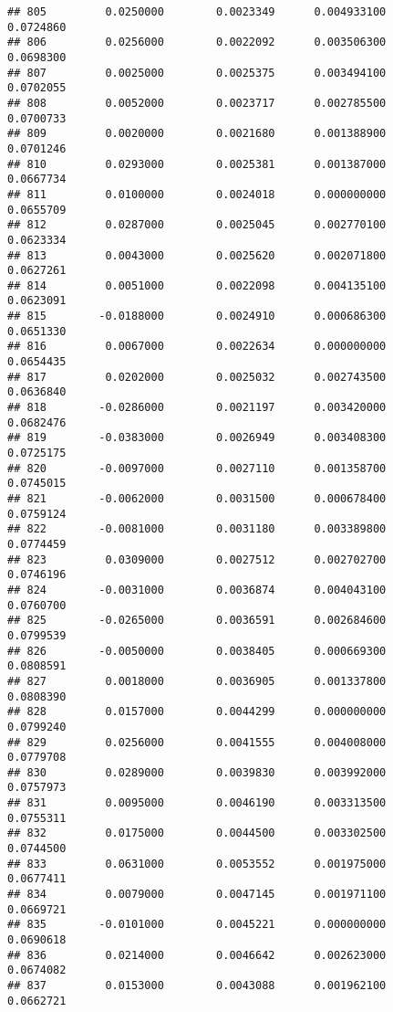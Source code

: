 \documentclass[
]{article}
\begin{document}
\begin{verbatim}
## 805         0.0250000        0.0023349      0.004933100             0.0724860
## 806         0.0256000        0.0022092      0.003506300             0.0698300
## 807         0.0025000        0.0025375      0.003494100             0.0702055
## 808         0.0052000        0.0023717      0.002785500             0.0700733
## 809         0.0020000        0.0021680      0.001388900             0.0701246
## 810         0.0293000        0.0025381      0.001387000             0.0667734
## 811         0.0100000        0.0024018      0.000000000             0.0655709
## 812         0.0287000        0.0025045      0.002770100             0.0623334
## 813         0.0043000        0.0025620      0.002071800             0.0627261
## 814         0.0051000        0.0022098      0.004135100             0.0623091
## 815        -0.0188000        0.0024910      0.000686300             0.0651330
## 816         0.0067000        0.0022634      0.000000000             0.0654435
## 817         0.0202000        0.0025032      0.002743500             0.0636840
## 818        -0.0286000        0.0021197      0.003420000             0.0682476
## 819        -0.0383000        0.0026949      0.003408300             0.0725175
## 820        -0.0097000        0.0027110      0.001358700             0.0745015
## 821        -0.0062000        0.0031500      0.000678400             0.0759124
## 822        -0.0081000        0.0031180      0.003389800             0.0774459
## 823         0.0309000        0.0027512      0.002702700             0.0746196
## 824        -0.0031000        0.0036874      0.004043100             0.0760700
## 825        -0.0265000        0.0036591      0.002684600             0.0799539
## 826        -0.0050000        0.0038405      0.000669300             0.0808591
## 827         0.0018000        0.0036905      0.001337800             0.0808390
## 828         0.0157000        0.0044299      0.000000000             0.0799240
## 829         0.0256000        0.0041555      0.004008000             0.0779708
## 830         0.0289000        0.0039830      0.003992000             0.0757973
## 831         0.0095000        0.0046190      0.003313500             0.0755311
## 832         0.0175000        0.0044500      0.003302500             0.0744500
## 833         0.0631000        0.0053552      0.001975000             0.0677411
## 834         0.0079000        0.0047145      0.001971100             0.0669721
## 835        -0.0101000        0.0045221      0.000000000             0.0690618
## 836         0.0214000        0.0046642      0.002623000             0.0674082
## 837         0.0153000        0.0043088      0.001962100             0.0662721

\end{verbatim}
\end{document}
